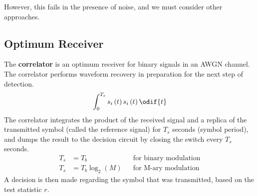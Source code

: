 \documentclass{article}
\begin{document}
However, this fails in the presence of noise, and we must consider
other approaches.
\subsection{Optimum Receiver}
The \textbf{correlator} is an optimum receiver for binary signals in an
AWGN channel. The correlator performs waveform recovery in preparation
for the next step of detection.
\begin{equation*}
    \int_0^{T_s} s_i\left( t \right) s_i\left( t \right) \odif{t}
\end{equation*}
The correlator integrates the product of the received signal and a
replica of the transmitted symbol (called the reference signal) for
\(T_s\) seconds (symbol period), and dumps the result to the decision
circuit by closing the switch every \(T_s\) seconds.
\begin{align*}
    T_s & = T_b                          &  & \text{for binary modulation} \\
    T_s & = T_b \log_2{\left( M \right)} &  & \text{for M-ary modulation}
\end{align*}
A decision is then made regarding the symbol that was transmitted, based
on the test statistic \(r\).
\end{document}
